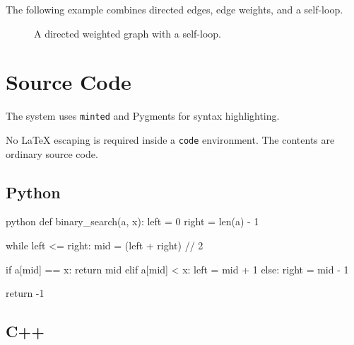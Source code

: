 \documentclass{csdept}
\begin{document}
The following example combines directed edges, edge weights,
and a self-loop.

\begin{figure}[htbp]
    \centering


    \caption{A directed weighted graph with a self-loop.}
    \label{fig:combined-graph}
\end{figure}


\section{Source Code}

The system uses \texttt{minted} and Pygments for syntax
highlighting.

No LaTeX escaping is required inside a \texttt{code} environment.
The contents are ordinary source code.

\subsection{Python}

\begin{code}{python}
def binary_search(a, x):
    left = 0
    right = len(a) - 1

    while left <= right:
        mid = (left + right) // 2

        if a[mid] == x:
            return mid
        elif a[mid] < x:
            left = mid + 1
        else:
            right = mid - 1

    return -1
\end{code}

\subsection{C++}
\end{document}
